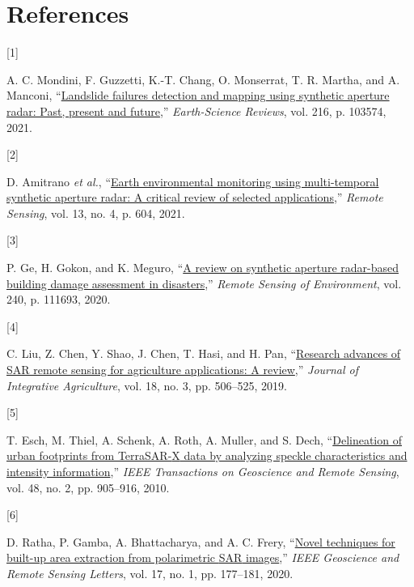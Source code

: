 \documentclass[
  lettersize  journal,
]{IEEEtran}%
\newlength{\cslhangindent}
\newlength{\csllabelwidth}
\newenvironment{CSLReferences}[2] %
 {\begin{list}{}{%
  \setlength{\itemindent}{0pt}
  \setlength{\leftmargin}{0pt}
  \setlength{\parsep}{0pt}
  \ifodd #1
   \setlength{\leftmargin}{\cslhangindent}
   \setlength{\itemindent}{-1\cslhangindent}
  \fi
  \setlength{\itemsep}{#2\baselineskip}}}
 {\end{list}}
\newcommand{\CSLLeftMargin}[1]{\parbox[t]{\csllabelwidth}{\strut#1\strut}}
\newcommand{\CSLRightInline}[1]{\parbox[t]{\linewidth - \csllabelwidth}{\strut#1\strut}}
\begin{document}
\section*{References}\label{references}

\label{refs}
\begin{CSLReferences}{0}{0}
\CSLLeftMargin{{[}1{]} }%
\CSLRightInline{A. C. Mondini, F. Guzzetti, K.-T. Chang, O. Monserrat,
T. R. Martha, and A. Manconi,
{``\href{https://doi.org/10.1016/j.earscirev.2021.103574}{Landslide
failures detection and mapping using synthetic aperture radar: Past,
present and future},''} \emph{Earth-Science Reviews}, vol. 216, p.
103574, 2021. }

\CSLLeftMargin{{[}2{]} }%
\CSLRightInline{D. Amitrano \emph{et al.},
{``\href{https://doi.org/10.3390/rs13040604}{Earth environmental
monitoring using multi-temporal synthetic aperture radar: A critical
review of selected applications},''} \emph{Remote Sensing}, vol. 13, no.
4, p. 604, 2021. }

\CSLLeftMargin{{[}3{]} }%
\CSLRightInline{P. Ge, H. Gokon, and K. Meguro,
{``\href{https://doi.org/10.1016/j.rse.2020.111693}{A review on
synthetic aperture radar-based building damage assessment in
disasters},''} \emph{Remote Sensing of Environment}, vol. 240, p.
111693, 2020. }

\CSLLeftMargin{{[}4{]} }%
\CSLRightInline{C. Liu, Z. Chen, Y. Shao, J. Chen, T. Hasi, and H. Pan,
{``\href{https://doi.org/10.1016/s2095-3119(18)62016-7}{Research
advances of SAR remote sensing for agriculture applications: A
review},''} \emph{Journal of Integrative Agriculture}, vol. 18, no. 3,
pp. 506--525, 2019. }

\CSLLeftMargin{{[}5{]} }%
\CSLRightInline{T. Esch, M. Thiel, A. Schenk, A. Roth, A. Muller, and S.
Dech, {``\href{https://doi.org/10.1109/tgrs.2009.2037144}{Delineation of
urban footprints from TerraSAR-{X} data by analyzing speckle
characteristics and intensity information},''} \emph{IEEE Transactions
on Geoscience and Remote Sensing}, vol. 48, no. 2, pp. 905--916, 2010. }

\CSLLeftMargin{{[}6{]} }%
\CSLRightInline{D. Ratha, P. Gamba, A. Bhattacharya, and A. C. Frery,
{``\href{https://doi.org/10.1109/LGRS.2019.2914913}{Novel techniques for
built-up area extraction from polarimetric {SAR} images},''} \emph{IEEE
Geoscience and Remote Sensing Letters}, vol. 17, no. 1, pp. 177--181,
2020. }


\end{CSLReferences}
\end{document}
